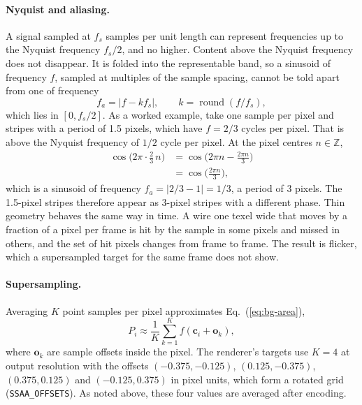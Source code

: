 \paragraph{Nyquist and aliasing.} A signal sampled at $f_s$ samples per unit length can represent frequencies up to the Nyquist frequency $f_s/2$, and no higher.\cite{shannon1949communication} Content above the Nyquist frequency does not disappear. It is folded into the representable band, so a sinusoid of frequency $f$, sampled at multiples of the sample spacing, cannot be told apart from one of frequency
\begin{equation}
f_a=\left|f-k f_s\right|,\qquad k=\operatorname{round}(f/f_s),\label{eq:bg-alias}
\end{equation}
which lies in $[0,f_s/2]$. As a worked example, take one sample per pixel and stripes with a period of 1.5 pixels, which have $f=2/3$ cycles per pixel. That is above the Nyquist frequency of $1/2$ cycle per pixel. At the pixel centres $n\in\mathbb Z$,
\begin{align*}
\cos\!\Big(2\pi\cdot\tfrac23\,n\Big)&=\cos\!\Big(2\pi n-\tfrac{2\pi n}{3}\Big)\\
&=\cos\!\Big(\tfrac{2\pi n}{3}\Big),
\end{align*}
which is a sinusoid of frequency $f_a=|2/3-1|=1/3$, a period of 3 pixels. The 1.5-pixel stripes therefore appear as 3-pixel stripes with a different phase. Thin geometry behaves the same way in time. A wire one texel wide that moves by a fraction of a pixel per frame is hit by the sample in some pixels and missed in others, and the set of hit pixels changes from frame to frame. The result is flicker, which a supersampled target for the same frame does not show.

\paragraph{Supersampling.} Averaging $K$ point samples per pixel approximates Eq.~(\ref{eq:bg-area}),
\begin{equation}
P_i\approx\frac1K\sum_{k=1}^{K}f(\mathbf c_i+\mathbf o_k),\label{eq:bg-ssaa}
\end{equation}
where $\mathbf o_k$ are sample offsets inside the pixel. The renderer's targets use $K=4$ at output resolution with the offsets $(-0.375,-0.125)$, $(0.125,-0.375)$, $(0.375,0.125)$ and $(-0.125,0.375)$ in pixel units, which form a rotated grid (\texttt{SSAA\_OFFSETS}). As noted above, these four values are averaged after encoding.

